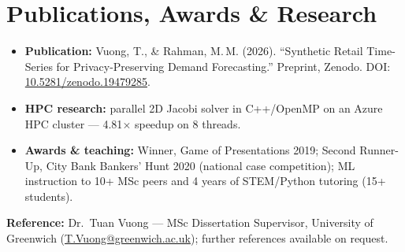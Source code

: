 \documentclass[10pt,a4paper]{article}
\begin{document}
\section{Publications, Awards \& Research}
\begin{itemize}
  \item \textbf{Publication:} Vuong, T., \& Rahman, M.\,M. (2026). ``Synthetic Retail Time-Series for Privacy-Preserving Demand Forecasting.'' Preprint, Zenodo. DOI: \href{https://doi.org/10.5281/zenodo.19479285}{10.5281/zenodo.19479285}.
  \item \textbf{HPC research:} parallel 2D Jacobi solver in C++/OpenMP on an Azure HPC cluster --- 4.81$\times$ speedup on 8 threads.
  \item \textbf{Awards \& teaching:} Winner, Game of Presentations 2019; Second Runner-Up, City Bank Bankers' Hunt 2020 (national case competition); ML instruction to 10+ MSc peers and 4 years of STEM/Python tutoring (15+ students).
\end{itemize}

\vspace{2pt}
{\small\color{muted}\textbf{\color{accent}Reference:} Dr.\ Tuan Vuong --- MSc Dissertation Supervisor, University of Greenwich (\href{mailto:T.Vuong@greenwich.ac.uk}{T.Vuong@greenwich.ac.uk}); further references available on request.}
\end{document}
